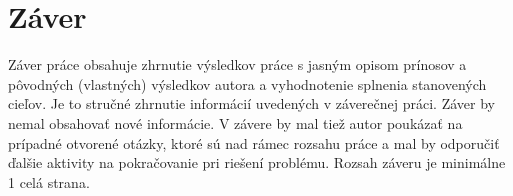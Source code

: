 \section{Záver}

Záver práce obsahuje zhrnutie výsledkov práce s jasným opisom prínosov a pôvodných (vlastných) výsledkov autora a vyhodnotenie splnenia stanovených cieľov. Je to stručné zhrnutie informácií uvedených v záverečnej práci. Záver by nemal obsahovať nové informácie. V závere by mal tiež autor poukázať na prípadné otvorené otázky, ktoré sú nad rámec rozsahu práce a mal by odporučiť ďalšie aktivity na pokračovanie pri riešení problému. Rozsah záveru je minimálne 1 celá strana.
